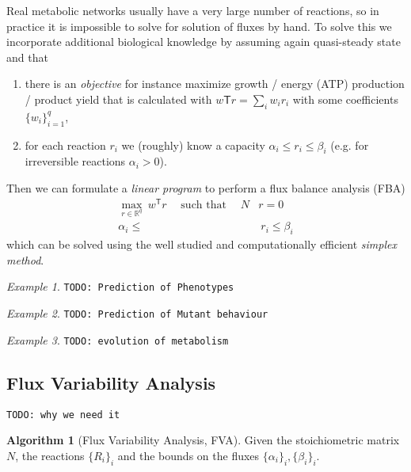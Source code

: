 \documentclass[a4paper]{article}
\newcommand{\todo}[1]{\texttt{TODO: #1}}
\newcommand{\T}{\mathsf{T}}
\DeclareMathOperator{\st}{such~that}
\theoremstyle{plain}
\theoremstyle{definition}
\newtheorem{alg}{Algorithm}[section]
\theoremstyle{remark}
\newtheorem*{example}{Example}
\begin{document}
Real metabolic networks usually have a very large number of reactions, so in
practice it is impossible to solve for solution of fluxes by hand. To solve
this we incorporate additional biological knowledge by assuming again
quasi-steady state and that
\begin{enumerate}
  \item there is an \emph{objective} for instance maximize growth / energy
    (ATP) production / product yield that is calculated with $w\T r = \sum_i
    w_i r_i$ with some coefficients $\{w_i\}_{i=1}^q$,
    
  \item for each reaction $r_i$ we (roughly) know a capacity $\alpha_i \leq
    r_i \leq \beta_i$ (e.g. for irreversible reactions $\alpha_i > 0$).
\end{enumerate}
Then we can formulate a \emph{linear program} to perform a flux balance
analysis (FBA)
\begin{align*}
  \max_{r \in \mathbb{R}^q} ~ w^\T r \quad \st \quad N&r = 0 \\
       \alpha_i \leq &~r_i \leq \beta_i
\end{align*}
which can be solved using the well studied and computationally efficient
\emph{simplex method}.

\begin{example}
  \todo{Prediction of Phenotypes}
\end{example}

\begin{example}
  \todo{Prediction of Mutant behaviour}
\end{example}

\begin{example}
  \todo{evolution of metabolism}
\end{example}

\subsection{Flux Variability Analysis}

\todo{why we need it}

\begin{alg}[Flux Variability Analysis, FVA]
  Given the stoichiometric matrix $N$, the reactions $\{R_i\}_i$ and the
  bounds on the fluxes $\{\alpha_i\}_i, \{\beta_i\}_i$.
  \begin{algorithmic}
    \EndFunction
  \end{algorithmic}
\end{alg}
\end{document}
